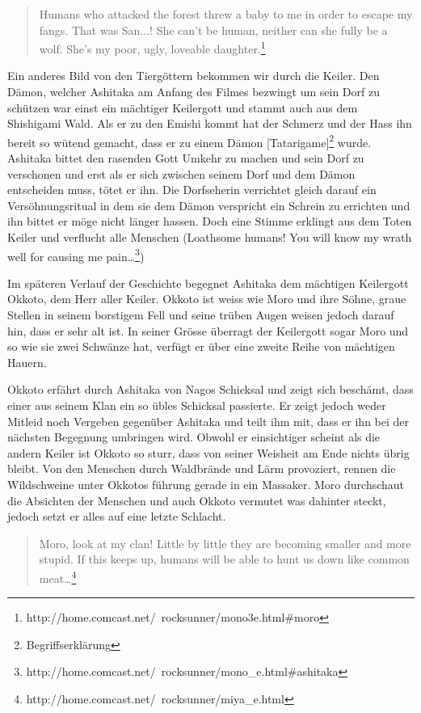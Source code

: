 \begin{quote}
Humans who attacked the forest threw a baby to me in order to escape my fangs. That was San...! She can't be human, neither can she fully be a wolf. She's my poor, ugly, loveable daughter.\footnote{http://home.comcast.net/~rocksunner/mono3e.html\#moro}
\end{quote}

Ein anderes Bild von den Tiergöttern bekommen wir durch die Keiler. Den Dämon, welcher Ashitaka am Anfang des Filmes bezwingt um sein Dorf zu schützen war einst ein mächtiger Keilergott und stammt auch aus dem Shishigami Wald. Als er zu den Emishi kommt hat der Schmerz und der Hass ihn bereit so wütend gemacht, dass er zu einem Dämon [Tatarigame]\footnote{Begriffserklärung} wurde. Ashitaka bittet den rasenden Gott Umkehr zu machen und sein Dorf zu verschonen und erst als er sich zwischen seinem Dorf und dem Dämon entscheiden muss, tötet er ihn. Die Dorfseherin verrichtet gleich darauf ein Versöhnungsritual in dem sie dem Dämon verspricht ein Schrein zu errichten und ihn bittet er möge nicht länger hassen. Doch eine Stimme erklingt aus dem Toten Keiler und verflucht alle Menschen (\glqq  Loathsome humans! You will know my wrath well for causing me pain\dots \grqq \footnote{http://home.comcast.net/~rocksunner/mono\_e.html\#ashitaka})

Im späteren Verlauf der Geschichte begegnet Ashitaka dem mächtigen Keilergott Okkoto, dem Herr aller Keiler. Okkoto ist weiss wie Moro und ihre Söhne, graue Stellen in seinem borstigem Fell und seine trüben Augen weisen jedoch darauf hin, dass er sehr alt ist. In seiner Grösse überragt der Keilergott sogar Moro und so wie sie zwei Schwänze hat, verfügt er über eine zweite Reihe von mächtigen Hauern. 

Okkoto erfährt durch Ashitaka von Nagos Schicksal und zeigt sich beschämt, dass einer aus seinem Klan ein so übles Schicksal passierte. Er zeigt jedoch weder Mitleid noch Vergeben gegenüber Ashitaka und teilt ihm mit, dass er ihn bei der nächsten Begegnung umbringen wird. Obwohl er einsichtiger scheint als die andern Keiler ist Okkoto so sturr, dass von seiner Weisheit am Ende nichts übrig bleibt. Von den Menschen durch Waldbrände und Lärm provoziert, rennen die Wildschweine unter Okkotos führung gerade in ein Massaker. Moro durchschaut die Absichten der Menschen und auch Okkoto vermutet was dahinter steckt, jedoch setzt er alles auf eine letzte Schlacht. 

\begin{quote}
Moro, look at my clan! Little by little they are becoming smaller and more stupid. If this keeps up, humans will be able to hunt us down like common meat\dots \footnote{http://home.comcast.net/~rocksunner/miya\_e.html} 
\end{quote}

